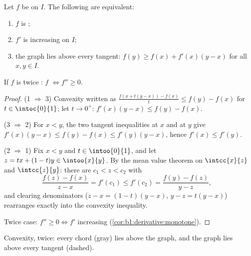 \begin{theorem}\label{thm:b1:derivative:convexchar}
Let $f$ be  on $I$. The following are equivalent:
\begin{enumerate}
  \item $f$ is ;
  \item $f'$ is increasing on $I$;
  \item the graph lies above every tangent: $f(y) \geq f(x) +
        f'(x)(y - x)$ for all $x, y \in I$.
\end{enumerate}
If $f$ is twice : $f$  $\iff f'' \geq 0$.
\end{theorem}

\begin{proof}
(1 $\Rightarrow$ 3) Convexity written as $\frac{f(x + t(y-x)) -
f(x)}{t} \leq f(y) - f(x)$ for $t \in \intoc{0}{1}$; let $t \to 0^+$:
$f'(x)(y - x) \leq f(y) - f(x)$.

(3 $\Rightarrow$ 2) For $x < y$, the two tangent inequalities at $x$
and at $y$ give $f'(x)(y-x) \leq f(y) - f(x) \leq f'(y)(y - x)$,
hence $f'(x) \leq f'(y)$.

(2 $\Rightarrow$ 1) Fix $x < y$ and $t \in \intoo{0}{1}$, and let $z
= tx + (1-t)y \in \intoo{x}{y}$. By the mean value theorem on
$\intcc{x}{z}$ and $\intcc{z}{y}$: there are $c_1 < z < c_2$ with
\[
\frac{f(z) - f(x)}{z - x} = f'(c_1) \leq f'(c_2)
= \frac{f(y) - f(z)}{y - z} ,
\]
and clearing denominators ($z - x = (1-t)(y-x)$, $y - z = t(y-x)$)
rearranges exactly into the convexity inequality.

Twice  case: $f'' \geq 0 \iff f'$ increasing
(\cref{cor:b1:derivative:monotone}).
\end{proof}

\begin{omfigure}

{\small Convexity, twice: every chord (gray) lies above the graph,
and the graph lies above every tangent (dashed).}
\end{omfigure}

